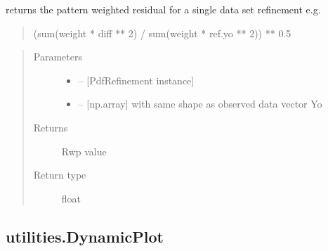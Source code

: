 \documentclass[letterpaper,10pt,english]{sphinxmanual}
\begin{document}
\begin{fulllineitems}
\label{\detokenize{rst/utilities:mstack.utilities.rwp}}
returns the pattern weighted residual for a single data set refinement
e.g.
\begin{quote}

(sum(weight * diff ** 2) / sum(weight * ref.yo ** 2)) ** 0.5
\end{quote}
\begin{quote}\begin{description}
\item[{Parameters}] \leavevmode\begin{itemize}
\item {} 
 -- {[}PdfRefinement instance{]}

\item {} 
 -- {[}np.array{]} with same shape as observed data vector Yo

\end{itemize}

\item[{Returns}] \leavevmode
Rwp value

\item[{Return type}] \leavevmode
float

\end{description}\end{quote}

\end{fulllineitems}



\subsection{utilities.DynamicPlot}
\label{\detokenize{rst/utilities:utilities-dynamicplot}}
\end{document}
